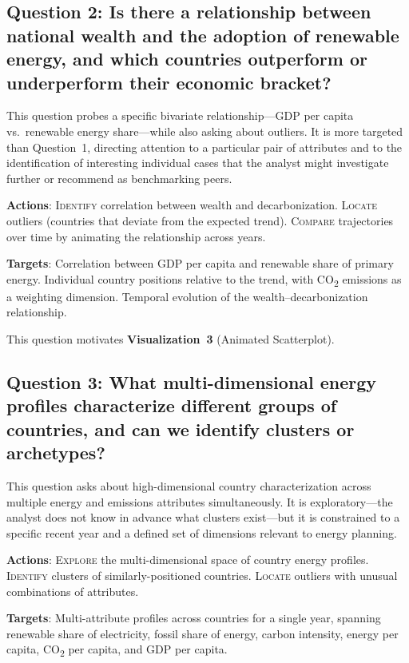 \documentclass[10pt]{article}
\begin{document}
\subsection{Question 2: Is there a relationship between national wealth and the adoption of renewable energy, and which countries outperform or underperform their economic bracket?}

This question probes a specific bivariate relationship---GDP per capita vs.\ renewable energy share---while also asking about outliers. It is more targeted than Question~1, directing attention to a particular pair of attributes and to the identification of interesting individual cases that the analyst might investigate further or recommend as benchmarking peers.

\textbf{Actions}: \textsc{Identify} correlation between wealth and decarbonization. \textsc{Locate} outliers (countries that deviate from the expected trend). \textsc{Compare} trajectories over time by animating the relationship across years.

\textbf{Targets}: Correlation between GDP per capita and renewable share of primary energy. Individual country positions relative to the trend, with CO\textsubscript{2} emissions as a weighting dimension. Temporal evolution of the wealth--decarbonization relationship.

This question motivates \textbf{Visualization~3} (Animated Scatterplot).

\subsection{Question 3: What multi-dimensional energy profiles characterize different groups of countries, and can we identify clusters or archetypes?}

This question asks about high-dimensional country characterization across multiple energy and emissions attributes simultaneously. It is exploratory---the analyst does not know in advance what clusters exist---but it is constrained to a specific recent year and a defined set of dimensions relevant to energy planning.

\textbf{Actions}: \textsc{Explore} the multi-dimensional space of country energy profiles. \textsc{Identify} clusters of similarly-positioned countries. \textsc{Locate} outliers with unusual combinations of attributes.

\textbf{Targets}: Multi-attribute profiles across countries for a single year, spanning renewable share of electricity, fossil share of energy, carbon intensity, energy per capita, CO\textsubscript{2} per capita, and GDP per capita.
\end{document}
